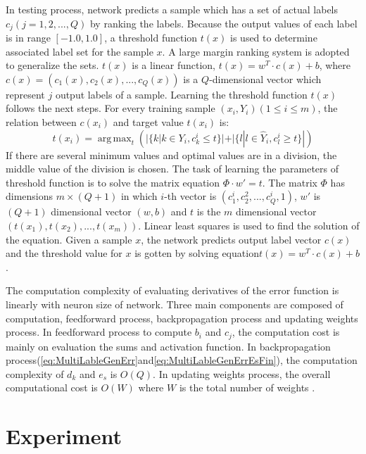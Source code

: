 In testing process, network predicts a sample which has a set of actual labels $c_{j} (j = 1,2,...,Q)$ by ranking the labels. Because the output values of each label is in range $[-1.0,1.0]$, a threshold function $t(x)$ is used to determine associated label set for the sample $x$. A large margin ranking system\citep{elisseeff2001kernel} is adopted to generalize the sets. $t(x)$ is a linear function, $t(x) = w^T\cdot c(x) + b$, where $c(x) = (c_{1}(x), c_{2}(x),...,c_{Q}(x))$ is a $Q$-dimensional vector which represent $j$ output labels of a sample. Learning the threshold function $t(x)$ follows the next steps. For every training sample $(x_{i}, Y_{i}) (1 \leq i \leq m)$, the relation between $c(x_{i})$ and target value $t(x_{i})$ is:
\begin{equation}\label{eq:MultiLableThreshFunc}
t(x_{i}) =  \operatorname{arg\,max}_t (|\{k|k \in Y_{i}, c_{k}^i \leq t\}| + |\{l|l \in \hat{Y}_{i}, c_{l}^i \geq t\}|) 
\end{equation}
If there are several minimum values and optimal values are in a division, the middle value of the division is chosen. The task of learning the parameters of threshold function is to solve the matrix equation $\Phi \cdot w' = t$. The matrix $\Phi$ has dimensions $m \times (Q + 1)$ in which $i$-th vector is $(c_{1}^i, c_{2}^2,...,c_{Q}^i,1)$, $w'$ is $(Q+1)$ dimensional vector $(w,b)$ and $t$ is the $m$ dimensional vector $(t(x_{1}), t(x_{2}),...,t(x_{m}))$. Linear least squares is used to find the solution of the equation. Given a sample $x$, the network predicts output label vector $c(x)$ and the threshold value for $x$ is gotten by solving equation$t(x) = w^T \cdot c(x) + b$.

The computation complexity of evaluating derivatives of the error function is linearly with neuron size of network. Three main components are composed of computation, feedforward process, backpropagation process and updating weights process. In feedforward process to compute $b_{i}$ and $c_{j}$, the computation cost is mainly on evaluation the sums and activation function. In backpropagation process(\ref{eq:MultiLableGenErr}and\ref{eq:MultiLableGenErrEsFin}), the computation complexity of $d_{k}$ and $e_{s}$ is $O(Q)$. In updating weights process, the overall computational cost is $O(W)$ where $W$ is the total number of weights . 

\section{Experiment}

